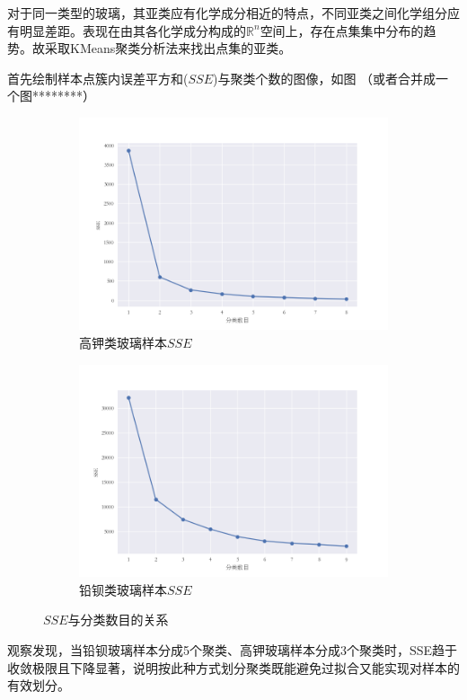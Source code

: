 \documentclass[withoutpreface,bwprint]{cumcmthesis}
\newcommand{\R}{\mathbb{R}}
\begin{document}
对于同一类型的玻璃，其亚类应有化学成分相近的特点，不同亚类之间化学组分应有明显差距。表现在由其各化学成分构成的$\R^{n}$空间上，存在点集集中分布的趋势。故采取KMeans聚类分析法来找出点集的亚类。

首先绘制样本点簇内误差平方和($SSE$)与聚类个数的图像，如图
（或者合并成一个图********）
\begin{figure}[H]
\begin{subfigure}[t]{.515\linewidth}
\centering
\includegraphics[width=.9\linewidth]{高钾类SSE.png}
\caption{高钾类玻璃样本$SSE$}
\end{subfigure}
\begin{subfigure}[t]{.515\linewidth}
\centering
\includegraphics[width=.9\linewidth]{铅钡类SSE.png}
\caption{铅钡类玻璃样本$SSE$}
\end{subfigure}
\caption{$SSE$与分类数目的关系}
\end{figure}


观察发现，当铅钡玻璃样本分成5个聚类、高钾玻璃样本分成3个聚类时，SSE趋于收敛极限且下降显著，说明按此种方式划分聚类既能避免过拟合又能实现对样本的有效划分。
\end{document}
